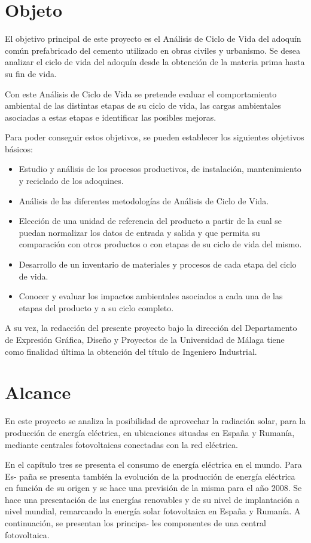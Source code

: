 \chapter{Objeto}
El objetivo principal de este proyecto es el Análisis de Ciclo de Vida del adoquín común prefabricado del cemento utilizado en obras civiles y urbanismo. Se desea analizar el ciclo de vida del adoquín desde la obtención de la materia prima hasta su fin de vida.

Con este Análisis de Ciclo de Vida se pretende evaluar el comportamiento ambiental de las distintas etapas de su ciclo de vida, las cargas ambientales asociadas a estas etapas e identificar las posibles mejoras.

Para poder conseguir estos objetivos, se pueden establecer los siguientes objetivos básicos:
\begin{itemize}
\item Estudio y análisis de los procesos productivos, de instalación, mantenimiento y reciclado de los adoquines.
\item Análisis de las diferentes metodologías de Análisis de Ciclo de Vida.
\item Elección de una unidad de referencia del producto a partir de la cual se puedan normalizar los datos de entrada y salida y que permita su comparación con otros productos o con etapas de su ciclo de vida del mismo.
\item Desarrollo de un inventario de materiales y procesos de cada etapa del ciclo de vida.
\item Conocer y evaluar los impactos ambientales asociados a cada una de las etapas del producto y a su ciclo completo.
\end{itemize}

A su vez, la redacción del presente proyecto bajo la dirección del Departamento de Expresión Gráfica, Diseño y Proyectos de la Universidad de Málaga tiene como finalidad última la obtención del título de Ingeniero Industrial.

\chapter{Alcance}

En este proyecto se analiza la posibilidad de aprovechar la radiación solar, para la producción de energía eléctrica, en ubicaciones situadas en España y Rumanía, mediante centrales fotovoltaicas conectadas con la red eléctrica.

En el capítulo tres se presenta el consumo de energía eléctrica en el mundo. Para Es- paña se presenta también la evolución de la producción de energía eléctrica en función de su origen y se hace una previsión de la misma para el año 2008. Se hace una presentación de las energías renovables y de su nivel de implantación a nivel mundial, remarcando la energía solar fotovoltaica en España y Rumanía. A continuación, se presentan los principa- les componentes de una central fotovoltaica.


